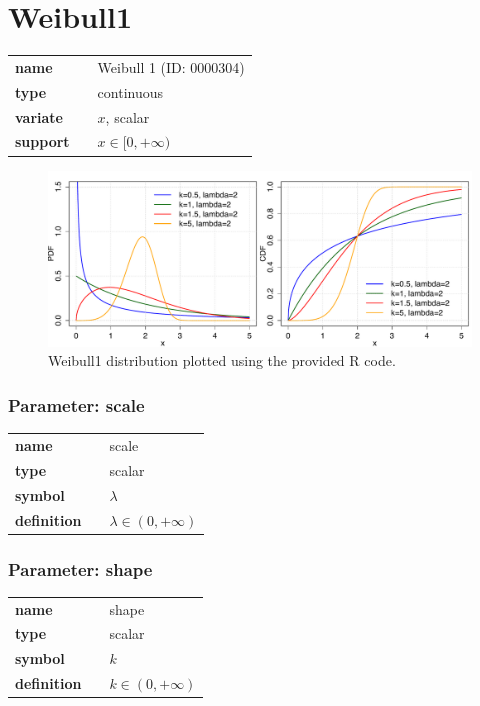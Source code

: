 \section*{Weibull1} 

  \bigskip 

\begin{tabular}{p{2cm}cl}
\textbf{name} & & Weibull 1 (ID: 0000304)\\ 
 
\textbf{type} & & continuous \\ 

\textbf{variate} & & $x$, scalar \\ 

\textbf{support} & & $x \in [0,+\infty)$
\end{tabular}

\begin{figure}[ht!]
\centering
  \includegraphics[width=140mm]{pics/Weibull1.pdf}
 \caption{Weibull1 distribution plotted using the provided R code.}
 \label{fig:Weibull1}
\end{figure}

\subsubsection*{Parameter: scale}

\noindent\begin{tabular}{p{2cm}cl}
\textbf{name} & & scale \\
\textbf{type} & & scalar \\
\textbf{symbol} & & $\lambda$  \\
\textbf{definition} & & $\lambda\in (0, +\infty)$
\end{tabular}
\subsubsection*{Parameter: shape}

\noindent\begin{tabular}{p{2cm}cl}
\textbf{name} & & shape \\
\textbf{type} & & scalar \\
\textbf{symbol} & & $k$  \\
\textbf{definition} & & $k\in (0, +\infty)$
\end{tabular}
